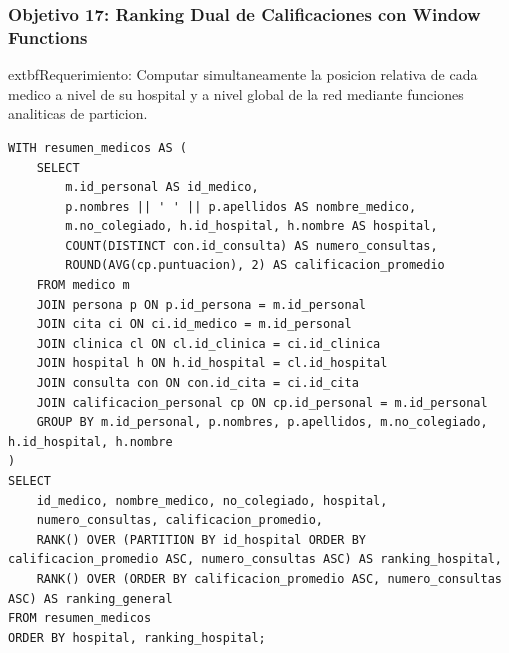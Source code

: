 \documentclass[11pt,a4paper]{article}
\begin{document}
\subsubsection{Objetivo 17: Ranking Dual de Calificaciones con Window Functions}
	extbf{Requerimiento:} Computar simultaneamente la posicion relativa de cada medico a nivel de su hospital y a nivel global de la red mediante funciones analiticas de particion.
\begin{lstlisting}[style=sqlstyle]
WITH resumen_medicos AS (
    SELECT 
        m.id_personal AS id_medico,
        p.nombres || ' ' || p.apellidos AS nombre_medico,
        m.no_colegiado, h.id_hospital, h.nombre AS hospital,
        COUNT(DISTINCT con.id_consulta) AS numero_consultas,
        ROUND(AVG(cp.puntuacion), 2) AS calificacion_promedio
    FROM medico m
    JOIN persona p ON p.id_persona = m.id_personal
    JOIN cita ci ON ci.id_medico = m.id_personal
    JOIN clinica cl ON cl.id_clinica = ci.id_clinica
    JOIN hospital h ON h.id_hospital = cl.id_hospital
    JOIN consulta con ON con.id_cita = ci.id_cita
    JOIN calificacion_personal cp ON cp.id_personal = m.id_personal
    GROUP BY m.id_personal, p.nombres, p.apellidos, m.no_colegiado, h.id_hospital, h.nombre
)
SELECT 
    id_medico, nombre_medico, no_colegiado, hospital,
    numero_consultas, calificacion_promedio,
    RANK() OVER (PARTITION BY id_hospital ORDER BY calificacion_promedio ASC, numero_consultas ASC) AS ranking_hospital,
    RANK() OVER (ORDER BY calificacion_promedio ASC, numero_consultas ASC) AS ranking_general
FROM resumen_medicos
ORDER BY hospital, ranking_hospital;
\end{lstlisting}
\end{document}
